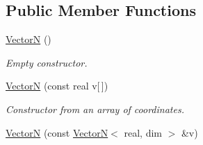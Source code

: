 \subsection*{Public Member Functions}
\begin{DoxyCompactItemize}
\item 
\hypertarget{classVectorN_af50158c7bc131bbfde53b5120cb6cddd}{
\hyperlink{classVectorN_af50158c7bc131bbfde53b5120cb6cddd}{VectorN} ()}
\label{classVectorN_af50158c7bc131bbfde53b5120cb6cddd}

\begin{DoxyCompactList}\small\item\em Empty constructor. \end{DoxyCompactList}\item 
\hypertarget{classVectorN_a6ef9847ef88fc72b3d0388ce79eaa2fe}{
\hyperlink{classVectorN_a6ef9847ef88fc72b3d0388ce79eaa2fe}{VectorN} (const real v\mbox{[}$\,$\mbox{]})}
\label{classVectorN_a6ef9847ef88fc72b3d0388ce79eaa2fe}

\begin{DoxyCompactList}\small\item\em Constructor from an array of coordinates. \end{DoxyCompactList}\item 
\hypertarget{classVectorN_a6dc444a7c6d3f168e0f54b5fdae51bf8}{
\hyperlink{classVectorN_a6dc444a7c6d3f168e0f54b5fdae51bf8}{VectorN} (const \hyperlink{classVectorN}{VectorN}$<$ real, dim $>$ \&v)}
\label{classVectorN_a6dc444a7c6d3f168e0f54b5fdae51bf8}


\end{DoxyCompactItemize}
